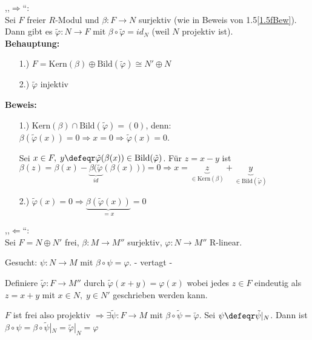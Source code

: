 \begin{Bew}
  ,,$\Rightarrow$``:\\
  Sei $F$ freier $R$-Modul und $\beta: F \to N$ surjektiv (wie in Beweis von
  1.5\ref{1.5fBew}). Dann gibt es $\tilde{\varphi}: N \to F$ mit $\beta \circ
  \tilde{\varphi} = id_N$ (weil $N$ projektiv ist).\\
  \textbf{Behauptung:}
  \begin{enumerate}
    \item[1.)] $F = \mbox{Kern}(\beta) \oplus \mbox{Bild}(\tilde{\varphi}) \cong
               N' \oplus N$
    \item[2.)] $\tilde{\varphi}$ injektiv
  \end{enumerate}
  \textbf{Beweis:}
  \begin{enumerate}
    \item[1.)] Kern$(\beta) \cap \mbox{Bild}(\tilde{\varphi}) = (0)$, denn:
               $\beta(\tilde{\varphi}(x)) = 0 \Rightarrow x = 0 \Rightarrow
               \tilde{\varphi}(x) = 0$.
  
               Sei $x \in F,\; y \defeqr
               \tilde{\varphi}(\beta(x)) \in \mbox{Bild}(\tilde{\varphi})$.
               Für $z = x - y$ ist $\beta(z) = \beta(x) -
               \underbrace{\beta(\tilde{\varphi}}_{id}(\beta(x)))= 0 \Rightarrow x = \underbrace{z}_{\in
               \textrm{Kern}(\beta)} + \underbrace{y}_{\in \textrm{Bild}(\tilde{\varphi})}$
    \item[2.)] $\tilde{\varphi}(x) = 0 \Rightarrow \underbrace{\beta(\tilde{\varphi}(x))}_{= x} = 0$
  \end{enumerate}
  ,,$\Leftarrow$``:\\
  Sei $F = N \oplus N'$ frei, $\beta: M \to M''$ surjektiv, $\varphi: N \to M''$
  R-linear.

  Gesucht: $\psi: N \to M$ mit $\beta \circ \psi = \varphi$. - vertagt -

  Definiere $\tilde{\varphi}: F \to M''$ durch $\tilde{\varphi}(x + y) =
  \varphi(x)$ wobei jedes $z \in F$ eindeutig als $z = x + y$ mit $x \in N,\; y
  \in N'$ geschrieben werden kann.

  $F$ ist frei also projektiv $\Rightarrow \exists \tilde{\psi}: F \to M$ mit
  $\beta \circ \tilde{\psi} = \tilde{\varphi}$. Sei $\psi \defeqr
  \tilde{\psi}|_N$. Dann ist $\beta \circ \psi = \beta \circ \tilde{\psi}|_N =
  \tilde{\varphi}|_N = \varphi$
\end{Bew}
